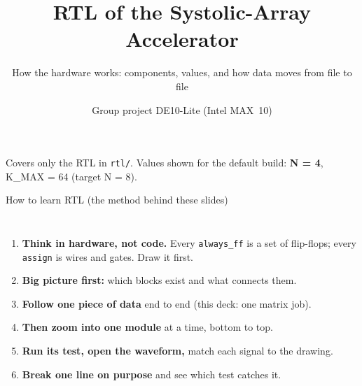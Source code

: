 \documentclass[aspectratio=169,11pt]{beamer}
\title{\textcolor{pcb}{RTL of the Systolic-Array Accelerator}}
\subtitle{How the hardware works: components, values, and how data moves from file to file}
\author{Group project \textperiodcentered{} DE10-Lite (Intel MAX~10)}
\date{}
\newcommand{\file}[1]{\texttt{\textcolor{copper}{#1}}}
\newcommand{\sig}[1]{\texttt{#1}}
\begin{document}
\begin{frame}
  \titlepage
  \centering\color{muted}\small
  Covers only the RTL in \file{rtl/}. Values shown for the default build:
  \textbf{N = 4}, K\_MAX = 64 (target N = 8).
\end{frame}

\begin{frame}{How to learn RTL (the method behind these slides)}
  \begin{columns}[T]
    \begin{enumerate}
      \item \textbf{Think in hardware, not code.} Every \sig{always\_ff} is a set of
            flip-flops; every \sig{assign} is wires and gates. Draw it first.
      \item \textbf{Big picture first:} which blocks exist and what connects them.
      \item \textbf{Follow one piece of data} end to end (this deck: one matrix job).
      \item \textbf{Then zoom into one module} at a time, bottom to top.
      \item \textbf{Run its test, open the waveform,} match each signal to the drawing.
      \item \textbf{Break one line on purpose} and see which test catches it.
    \end{enumerate}
  \end{columns}
\end{frame}
\end{document}
